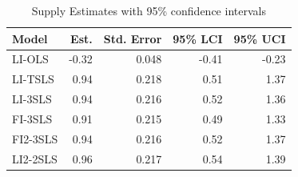 \begin{table}[htbp]
\centering
\caption{Supply Estimates with 95\% confidence intervals}
\label{tab:estimates}
\begin{tabular}{lrrrr}
\toprule
Model & Est. & Std. Error & 95\% LCI & 95\% UCI \\
\midrule
LI-OLS    & -0.32 & 0.048 & -0.41 & -0.23 \\
LI-TSLS   &  0.94 & 0.218 &  0.51 &  1.37 \\
LI-3SLS   &  0.94 & 0.216 &  0.52 &  1.36 \\
FI-3SLS   &  0.91 & 0.215 &  0.49 &  1.33 \\
FI2-3SLS  &  0.94 & 0.216 &  0.52 &  1.37 \\
LI2-2SLS  &  0.96 & 0.217 &  0.54 &  1.39 \\
\bottomrule
\end{tabular}
\end{table}
